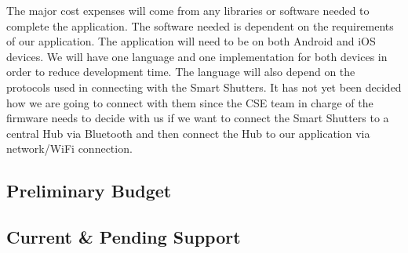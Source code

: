 The major cost expenses will come from any libraries or software needed to complete the application. The software needed is dependent on the requirements of our application. The application will need to be on both Android and iOS devices. We will have one language and one implementation for both devices in order to reduce development time. The language will also depend on the protocols used in connecting with the Smart Shutters. It has not yet been decided how we are going to connect with them since the CSE team in charge of the firmware needs to decide with us if we want to connect the Smart Shutters to a central Hub via Bluetooth and then connect the Hub to our application via network/WiFi connection. 


\subsection{Preliminary Budget}
 

\subsection{Current \& Pending Support}
